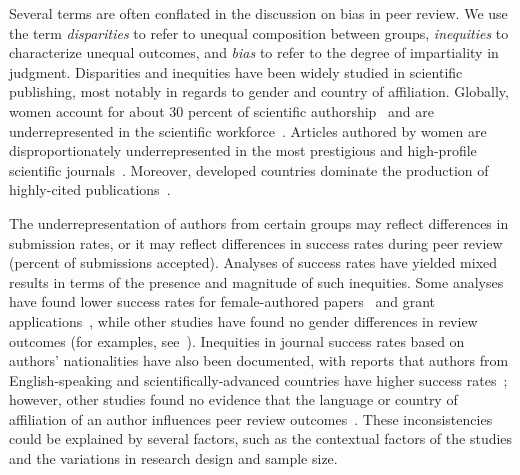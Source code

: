\documentclass[10pt,letterpaper]{article}
\begin{document}
Several terms are often conflated in the discussion on bias in peer review. We use the term \textit{disparities} to refer to unequal composition between groups, \textit{inequities} to characterize unequal outcomes, and \textit{bias} to refer to the degree of impartiality in judgment. Disparities and inequities have been widely studied in scientific publishing, most notably in regards to gender and country of affiliation. Globally, women account for about 30 percent of scientific authorship~\cite{lariviere_bibliometrics:_2013} and are underrepresented in the scientific workforce~\cite{noauthor_women_2017, noauthor_gender_2017}. Articles authored by women are disproportionately underrepresented in the most prestigious and high-profile scientific journals~\cite{west_role_2013,lariviere_end_2017, bendels_gender_2018, bernard_editorial:_2018, shen_persistent_2018, noauthor_natures_2018}. Moreover, developed countries dominate the production of highly-cited publications~\cite{king_scientific_2004, white_science_2017}.
 
The underrepresentation of authors from certain groups may reflect differences in submission rates, or it may reflect differences in success rates during peer review (percent of submissions accepted). Analyses of success rates have yielded mixed results in terms of the presence and magnitude of such inequities. Some analyses have found lower success rates for female-authored papers~\cite{wenneras_nepotism_1997, li_gender_2011} and grant applications~\cite{tamblyn_assessment_2018, witteman_female_2017}, while other studies have found no gender differences in review outcomes (for examples, see~\cite{grant_no_1997, gilbert_is_1994, mutz_does_2012, beck_gender_2017}). Inequities in journal success rates based on authors’ nationalities have also been documented, with reports that authors from English-speaking and scientifically-advanced countries have higher success rates~\cite{coates_language_2002, primack_bias_2008}; however, other studies found no evidence that the language or country of affiliation of an author influences peer review outcomes~\cite{harris_explicit_2017, primack_gender_2009, yousefi-nooraie_country_2006, primack_bias_2008}. These inconsistencies could be explained by several factors, such as the contextual factors of the studies and the variations in research design and sample size. 
\end{document}
